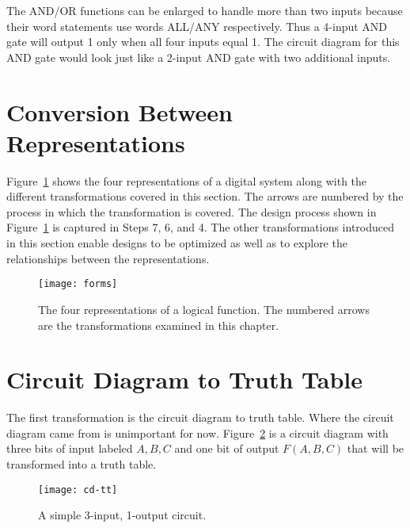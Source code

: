 The AND/OR functions can be enlarged to handle more than
two inputs because their word statements use words ALL/ANY
respectively.  Thus a 4-input AND gate will output 1
only when all four inputs equal 1.  The circuit diagram for 
this AND gate would look just like a 2-input AND gate with
two additional inputs.

\section{Conversion Between Representations}
Figure~\ref{fig:representationsForms} shows the four representations of a digital system
along with the different transformations covered in this section.  
The arrows are numbered by the process in which the transformation is
covered.  The design process shown in Figure~\ref{fig:representationsForms} is captured
in Steps 7, 6, and 4.  The other transformations introduced in this 
section enable designs to be optimized as well as to explore 
the relationships between the representations.

\begin{figure}[ht]
\texttt{[image: forms]}
\caption{The four representations of a logical function.  The
numbered arrows are the transformations examined in this chapter.}
\label{fig:representationsForms}
\end{figure}

\section{Circuit Diagram to Truth Table}

The first transformation is the circuit diagram to truth table.  
Where the circuit diagram came from is unimportant for now.
Figure~\ref{fig:representationsCD-TT} is a circuit diagram with three bits of 
input labeled $A,B,C$ and one bit of output $F(A,B,C)$ that will
be transformed into a truth table.

\begin{figure}[ht]
\texttt{[image: cd-tt]}
\caption{A simple 3-input, 1-output circuit.}
\label{fig:representationsCD-TT}
\end{figure}

